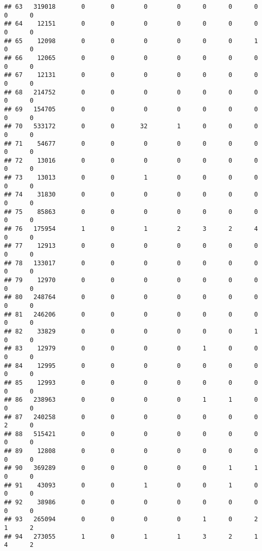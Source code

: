 \documentclass[
]{article}
\begin{document}
\begin{verbatim}
## 63   319018       0       0        0        0      0      0      0     0      0
## 64    12151       0       0        0        0      0      0      0     0      0
## 65    12098       0       0        0        0      0      0      1     0      0
## 66    12065       0       0        0        0      0      0      0     0      0
## 67    12131       0       0        0        0      0      0      0     0      0
## 68   214752       0       0        0        0      0      0      0     0      0
## 69   154705       0       0        0        0      0      0      0     0      0
## 70   533172       0       0       32        1      0      0      0     0      0
## 71    54677       0       0        0        0      0      0      0     0      0
## 72    13016       0       0        0        0      0      0      0     0      0
## 73    13013       0       0        1        0      0      0      0     0      0
## 74    31830       0       0        0        0      0      0      0     0      0
## 75    85863       0       0        0        0      0      0      0     0      0
## 76   175954       1       0        1        2      3      2      4     0      0
## 77    12913       0       0        0        0      0      0      0     0      0
## 78   133017       0       0        0        0      0      0      0     0      0
## 79    12970       0       0        0        0      0      0      0     0      0
## 80   248764       0       0        0        0      0      0      0     0      0
## 81   246206       0       0        0        0      0      0      0     0      0
## 82    33829       0       0        0        0      0      0      1     0      0
## 83    12979       0       0        0        0      1      0      0     0      0
## 84    12995       0       0        0        0      0      0      0     0      0
## 85    12993       0       0        0        0      0      0      0     0      0
## 86   238963       0       0        0        0      1      1      0     0      0
## 87   240258       0       0        0        0      0      0      0     2      0
## 88   515421       0       0        0        0      0      0      0     0      0
## 89    12808       0       0        0        0      0      0      0     0      0
## 90   369289       0       0        0        0      0      1      1     0      0
## 91    43093       0       0        1        0      0      1      0     0      0
## 92    38986       0       0        0        0      0      0      0     0      0
## 93   265094       0       0        0        0      1      0      2     1      2
## 94   273055       1       0        1        1      3      2      1     4      2

\end{verbatim}
\end{document}
